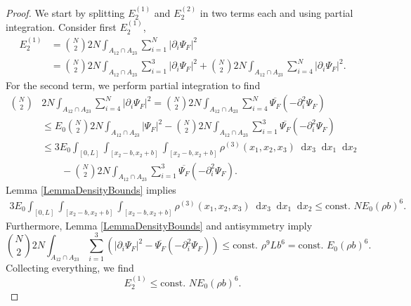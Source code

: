 \documentclass[a4paper,11pt]{article}
\newcommand{\abs}[1]{\left\lvert #1 \right\rvert}
\newcommand*\diff{\mathop{}\!\mathrm{d}}
\numberwithin{equation}{section}
\begin{document}
		\begin{proof}
		We start by splitting $ E_2^{(1)} $ and $ E_2^{(2)} $ in two terms each and using partial integration. Consider first $ E_2^{(1)} $,  
		\begin{equation}
		\begin{aligned}
		E_2^{(1)}&=\binom{N}{2}2N\int_{A_{12}\cap A_{23}}\sum_{i=1}^{N}\abs{\partial_i\Psi_F}^2\\
		&=\binom{N}{2}2N\int_{A_{12}\cap A_{23}}\sum_{i=1}^{3}\abs{\partial_i\Psi_F}^2+\binom{N}{2}2N\int_{A_{12}\cap A_{23}}\sum_{i=4}^{N}\abs{\partial_i\Psi_F}^2.
		\end{aligned}
		\end{equation}
		For the second term, we perform partial integration to find \begin{equation}
		\begin{aligned}
		\binom{N}{2}&2N\int_{A_{12}\cap A_{23}}\sum_{i=4}^{N}\abs{\partial_i\Psi_F}^2=\binom{N}{2}2N\int_{A_{12}\cap A_{23}}\sum_{i=4}^{N}\overline{\Psi_F}(-\partial^2_i\Psi_F)\\
		&\leq E_0 \binom{N}{2}2N\int_{A_{12}\cap A_{23}}\abs{\Psi_F}^2-\binom{N}{2}2N\int_{A_{12}\cap A_{23}}\sum_{i=1}^{3}\overline{\Psi_F}(-\partial^2_i\Psi_F)\\&\leq 3E_0\int_{[0,L]}\int_{[x_2-b,x_2+b]}\int_{[x_2-b,x_2+b]}\rho^{(3)}(x_1,x_2,x_3)\diff x_3\diff x_1\diff x_2\\
        &\qquad  -\binom{N}{2}2N\int_{A_{12}\cap A_{23}}\sum_{i=1}^{3}\overline{\Psi_F}(-\partial^2_i\Psi_F).
		\end{aligned}
		\end{equation}
		Lemma \ref{LemmaDensityBounds} implies \begin{equation}
		\begin{aligned}
		3E_0\int_{[0,L]}\int_{[x_2-b,x_2+b]}\int_{[x_2-b,x_2+b]}\rho^{(3)}(x_1,x_2,x_3)\diff x_3\diff x_1\diff x_2\leq \text{const. }NE_0(\rho b)^6.
		\end{aligned}
		\end{equation}
		Furthermore, Lemma \ref{LemmaDensityBounds} and antisymmetry imply \begin{equation}
		\binom{N}{2}2N\int_{A_{12}\cap A_{23}}\sum_{i=1}^{3}\left(\abs{\partial_i\Psi_F}^2-\overline{\Psi_F}(-\partial^2_i\Psi_F)\right)\leq \text{const. }\rho^9 L b^6=\text{const. }E_0 (\rho b)^6.
		\end{equation}
		Collecting everything, we find \begin{equation}
		E_2^{(1)}\leq \text{const. }NE_0(\rho b)^6.

\end{equation}
\end{proof}
\end{document}
